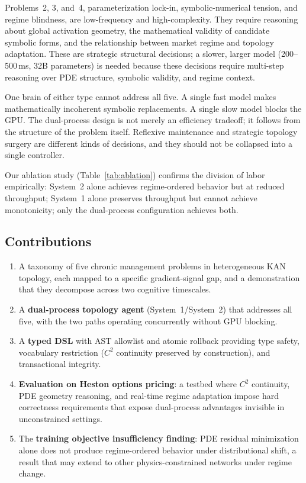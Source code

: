 \documentclass[11pt,a4paper]{article}
\begin{document}
Problems~2, 3, and~4, parameterization lock-in, symbolic-numerical tension, and
regime blindness, are low-frequency and high-complexity. They require reasoning about
global activation geometry, the mathematical validity of candidate symbolic forms,
and the relationship between market regime and topology adaptation. These are
strategic structural decisions; a slower, larger model (200--500\,ms, 32B parameters)
is needed because these decisions require multi-step reasoning over PDE structure,
symbolic validity, and regime context.

One brain of either type cannot address all five. A single fast model makes
mathematically incoherent symbolic replacements. A single slow model blocks the GPU.
The dual-process design is not merely an efficiency tradeoff; it follows from the
structure of the problem itself. Reflexive maintenance and strategic topology surgery
are different kinds of decisions, and they should not be collapsed into a single
controller.

Our ablation study (Table~\ref{tab:ablation}) confirms the division of labor
empirically: System~2 alone achieves regime-ordered behavior but at reduced
throughput; System~1 alone preserves throughput but cannot achieve monotonicity;
only the dual-process configuration achieves both.

\subsection{Contributions}
\label{sec:intro:contributions}

\begin{enumerate}
  \item A taxonomy of five chronic management problems in heterogeneous KAN topology,
  each mapped to a specific gradient-signal gap, and a demonstration that they decompose
  across two cognitive timescales.

  \item A \textbf{dual-process topology agent} (System~1/System~2) that addresses all
  five, with the two paths operating concurrently without GPU blocking.

  \item A \textbf{typed DSL} with AST allowlist and atomic rollback providing type
  safety, vocabulary restriction ($C^2$ continuity preserved by construction), and
  transactional integrity.

  \item \textbf{Evaluation on Heston options pricing}: a testbed where $C^2$
  continuity, PDE geometry reasoning, and real-time regime adaptation impose hard
  correctness requirements that expose dual-process advantages invisible in
  unconstrained settings.

  \item The \textbf{training objective insufficiency finding}: PDE residual
  minimization alone does not produce regime-ordered behavior under distributional
  shift, a result that may extend to other physics-constrained networks under regime change.
\end{enumerate}
\end{document}
